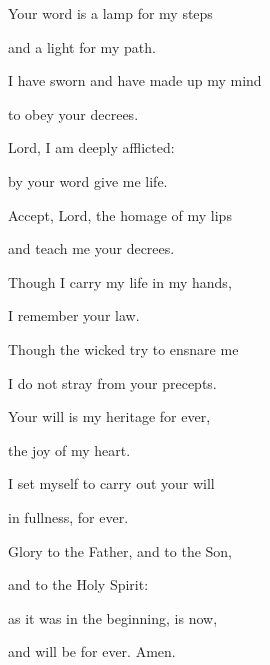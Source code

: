 \noindent Your word is a lamp for my steps ~\GreStar{}~\nopagebreak

and a light for my path.

\noindent I have sworn and have made up my mind ~\GreStar{}~\nopagebreak

to obey your decrees.

\noindent Lord, I am deeply afflicted: ~\GreStar{}~\nopagebreak

by your word give me life.

\noindent Accept, Lord, the homage of my lips ~\GreStar{}~\nopagebreak

and teach me your decrees.

\noindent Though I carry my life in my hands, ~\GreStar{}~\nopagebreak

I remember your law.

\noindent Though the wicked try to ensnare me ~\GreStar{}~\nopagebreak

I do not stray from your precepts.

\noindent Your will is my heritage for ever, ~\GreStar{}~\nopagebreak

the joy of my heart.

\noindent I set myself to carry out your will ~\GreStar{}~\nopagebreak

in fullness, for ever.



\noindent Glory to the Father, and to the Son,~\GreStar{}~\nopagebreak

and to the Holy Spirit:

\noindent as it was in the beginning, is now,~\GreStar{}~\nopagebreak

and will be for ever. Amen.
